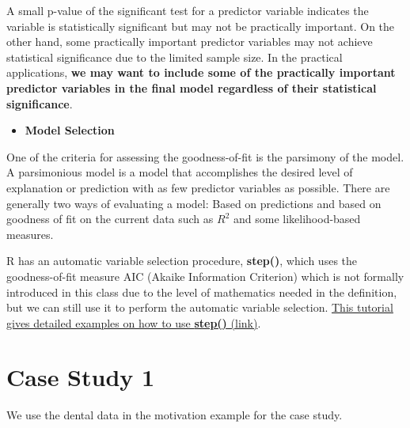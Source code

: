 \documentclass[
]{book}
\providecommand{\tightlist}{%
  \setlength{\itemsep}{0pt}\setlength{\parskip}{0pt}}
\begin{document}
A small p-value of the significant test for a predictor variable indicates the variable is statistically significant but may not be practically important. On the other hand, some practically important predictor variables may not achieve statistical significance due to the limited sample size. In the practical applications, \textbf{we may want to include some of the practically important predictor variables in the final model regardless of their statistical significance}.

\begin{itemize}
\tightlist
\item
  \textbf{Model Selection}
\end{itemize}

One of the criteria for assessing the goodness-of-fit is the parsimony of the model. A parsimonious model is a model that accomplishes the desired level of explanation or prediction with as few predictor variables as possible. There are generally two ways of evaluating a model: Based on predictions and based on goodness of fit on the current data such as \(R^2\) and some likelihood-based measures.

R has an automatic variable selection procedure, \textbf{step()}, which uses the goodness-of-fit measure AIC (Akaike Information Criterion) which is not formally introduced in this class due to the level of mathematics needed in the definition, but we can still use it to perform the automatic variable selection. \href{http://rstudio-pubs-static.s3.amazonaws.com/2899_a9129debf6bd47d2a0501de9c0dc583d.html}{This tutorial gives detailed examples on how to use \textbf{step()} (link)}.

\hypertarget{case-study-1}{%
\section{Case Study 1}\label{case-study-1}}

We use the dental data in the motivation example for the case study.
\end{document}
